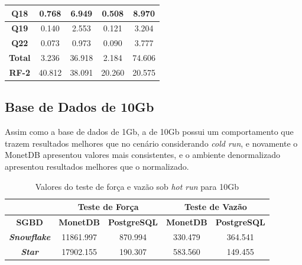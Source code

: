 \begin{table}[t]
\begin{tabular}{|c|c|c|c|c|}
        \textbf{Q18}   & 0.768             & 6.949               & 0.508            & 8.970               \\ \hline
        \textbf{Q19}   & 0.140             & 2.553               & 0.121            & 3.204               \\ \hline
        \textbf{Q22}   & 0.073             & 0.973               & 0.090            & 3.777               \\ \hline
        \textbf{Total} & 3.236             & 36.918              & 2.184            & 74.606              \\ \hline
        \textbf{RF-2}  & 40.812            & 38.091              & 20.260           & 20.575              \\ \hline
        \end{tabular}
        \end{table}



\subsection{Base de Dados de 10Gb}

Assim como a base de dados de 1Gb, a de 10Gb possui um comportamento que trazem resultados melhores que no cenário considerando \textit{cold run}, e novamente o MonetDB apresentou valores mais consistentes, e o ambiente denormalizado apresentou resultados melhores que o normalizado.

\begin{table}[htpb]
        \centering
        \caption{Valores do teste de força e vazão sob \textit{hot run} para 10Gb}
        \label{tab:forca_vazao_hot_10}
        \begin{tabular}{|c|c|c|c|c|}
        \hline
        & \multicolumn{2}{c|}{\textbf{Teste de Força}} & \multicolumn{2}{c|}{\textbf{Teste de Vazão}} \\ \hline
        \textbf{SGBD}               & \textbf{MonetDB}    & \textbf{PostgreSQL}    & \textbf{MonetDB}    & \textbf{PostgreSQL}    \\ \hline
        \textit{\textbf{Snowflake}} & 11861.997           & 870.994                & 330.479             & 364.541                \\ \hline
        \textit{\textbf{Star}}      & 17902.155           & 190.307                & 583.560             & 149.455                \\ \hline
        \end{tabular}
\end{table}

